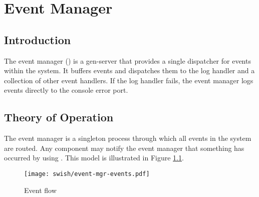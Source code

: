%
%
%

\chapter {Event Manager}\label{chap:event-mgr}

\section {Introduction}

The event manager () is a gen-server that provides a
single dispatcher for events within the system. It buffers events and
dispatches them to the log handler and a collection of other event
handlers. If the log handler fails, the event manager logs events
directly to the console error port.

\section {Theory of Operation}

The event manager is a singleton process through which all events in
the system are routed. Any component may notify the event manager that
something has occurred by using . This model
is illustrated in Figure \ref{fig:event-mgr-flow}.

\begin{figure}
  \begin{center}
    \texttt{[image: swish/event-mgr-events.pdf]}
  \end{center}
  \caption{\label{fig:event-mgr-flow}Event flow}
\end{figure}

